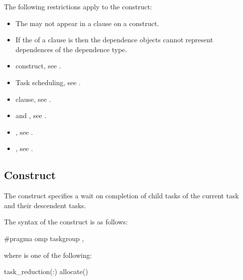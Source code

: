 \restrictions
The following restrictions apply to the  construct:

\begin{itemize}
\item The   may not appear in a
       clause on a  construct.
\item If the  of a  clause is 
      then the dependence  objects cannot represent dependences of the 
        dependence type.
\end{itemize}

\crossreferences
\begin{itemize}
\item {} construct, see .

\item Task scheduling, see
.

\item {} clause, see .

\item {} and , see
.

\item {}, see
.

\item {}, see
.
\end{itemize}



\subsection{ Construct}
\label{subsec:taskgroup Construct}
\summary
The  construct specifies a wait on completion of child tasks 
of the current task and their descendent tasks.

\syntax
\begin{ccppspecific}
The syntax of the  construct is as follows:

\begin{ompcPragma}
#pragma omp taskgroup \plc{[clause[[},\plc{] clause] ...]} 
\end{ompcPragma}

where  is one of the following:

\begin{indentedcodelist}
task_reduction(:)
allocate(\plc{[allocator: ]})
\end{indentedcodelist}
\end{ccppspecific}


